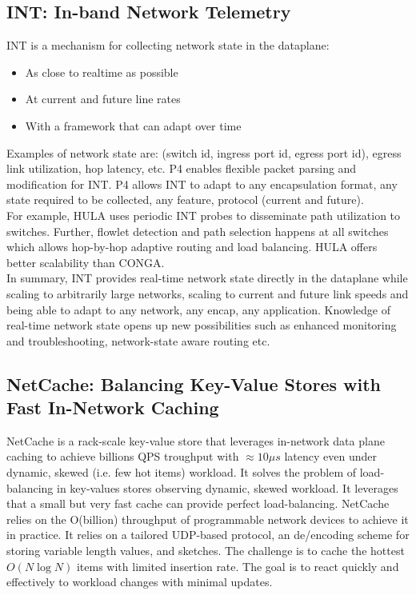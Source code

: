 \documentclass[11pt,oneside,a4paper]{article}
\begin{document}
\subsection{INT: In-band Network Telemetry}

INT is a mechanism for collecting network state in the dataplane:

\vspace{-\topsep}
\begin{itemize}
	\setlength{\itemsep}{0pt}
	\setlength{\parskip}{0pt}
	\item As close to realtime as possible
	\item At current and future line rates
	\item With a framework that can adapt over time
\end{itemize}
\vspace{-\topsep}

\noindent Examples of network state are: (switch id, ingress port id, egress port id), egress link utilization, hop latency, etc. P4 enables flexible packet parsing and modification for INT. P4 allows INT to adapt to any encapsulation format, any state required to be collected, any feature, protocol (current and future).\\
For example, HULA uses periodic INT probes to disseminate path utilization to switches. Further, flowlet detection and path selection happens at all switches which allows hop-by-hop adaptive routing and load balancing. HULA offers better scalability than CONGA.\\

\noindent In summary, INT provides real-time network state directly in the dataplane while scaling to arbitrarily large networks, scaling to current and future link speeds and being able to adapt to any network, any encap, any application. Knowledge of real-time network state opens up new possibilities such as enhanced monitoring and troubleshooting, network-state aware routing etc.

\subsection{NetCache: Balancing Key-Value Stores with Fast In-Network Caching}

NetCache \cite{netcache} is a rack-scale key-value store that leverages in-network data plane caching to achieve billions QPS troughput with $\approx 10 \mu s$ latency even under dynamic, skewed (i.e. few hot items) workload. It solves the problem of load-balancing in key-values stores observing dynamic, skewed workload. It leverages that a small but very fast cache can provide perfect load-balancing. NetCache relies on the O(billion) throughput of programmable network devices to achieve it in practice. It relies on a tailored UDP-based protocol, an de/encoding scheme for storing variable length values, and sketches. The challenge is to cache the hottest $O(N \log N)$ items with limited insertion rate. The goal is to react quickly and effectively to workload changes with minimal updates.
\end{document}
